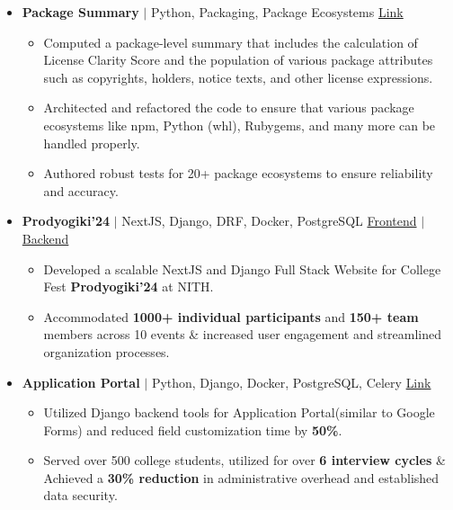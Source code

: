 \documentclass[a4,10pt]{article}
\begin{document}
\begin{itemize}[leftmargin=*]
\item \textbf{Package Summary} $|$ Python, Packaging, Package Ecosystems  \hfill \href{https://github.com/aboutcode-org/scancode-toolkit}{Link}
\begin{itemize}[label=$\diamond$,itemsep=0pt]
    \item Computed a package-level summary that includes the calculation of License Clarity Score and the population of various package attributes such as copyrights, holders, notice texts, and other license expressions.
    \item Architected and refactored the code to ensure that various package ecosystems like npm, Python (whl), Rubygems, and many more can be handled properly.
    \item Authored robust tests for 20+ package ecosystems to ensure reliability and accuracy.
\end{itemize}

\item \textbf{Prodyogiki'24} $|$ NextJS, Django, DRF, Docker, PostgreSQL \hfill \href{https://github.com/istenith/prody-frontend}{Frontend} $|$ \href{https://github.com/istenith/prody-backend}{Backend}

\begin{itemize}[label=$\diamond$]
    \item Developed a scalable NextJS and Django Full Stack Website for College Fest \textbf{Prodyogiki'24} at NITH.
    \item Accommodated \textbf{1000+ individual participants} and \textbf{150+ team} members across 10 events \& increased user engagement and streamlined organization processes.
\end{itemize}

\item \textbf{Application Portal} $|$ Python, Django, Docker, PostgreSQL, Celery  \hfill \href{https://github.com/istenith/join.istenith.com}{Link}

\begin{itemize}[label=$\diamond$]
    \item Utilized Django backend tools for Application Portal(similar to Google Forms) and reduced field customization time by \textbf{50\%}.
    \item Served over 500 college students, utilized for over \textbf{6 interview cycles} \& Achieved a \textbf{30\% reduction} in administrative overhead and established data security.
\end{itemize}

\end{itemize}
\end{document}
